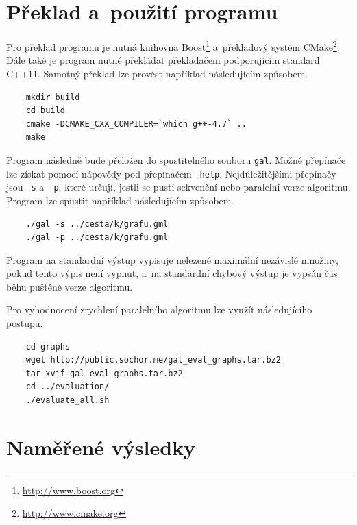 \documentclass[12pt]{article}
\begin{document}
\appendix
\section{Překlad a~použití programu} \label{appendix:ProgramUsage}
Pro překlad programu je nutná knihovna Boost\footnote{\url{http://www.boost.org}} a~překladový systém CMake\footnote{\url{http://www.cmake.org}}. Dále také je program nutné překládat překladačem podporujícím standard C++11. Samotný překlad lze provést například následujícím způsobem.
\begin{verbatim}
    mkdir build
    cd build
    cmake -DCMAKE_CXX_COMPILER=`which g++-4.7` ..
    make
\end{verbatim}

Program následně bude přeložen do spustitelného souboru \texttt{gal}. Možné přepínače lze získat pomocí nápovědy pod přepínačem \texttt{--help}. Nejdůležitějšími přepínačy jsou \texttt{-s} a~\texttt{-p}, které určují, jestli se pustí sekvenční nebo paralelní verze algoritmu. Program lze spustit například následujícím způsobem.
\begin{verbatim}
    ./gal -s ../cesta/k/grafu.gml
    ./gal -p ../cesta/k/grafu.gml
\end{verbatim}

Program na standardní výstup vypisuje nelezené maximální nezávislé množiny, pokud tento výpis není vypnut, a~na standardní chybový výstup je vypsán čas běhu puštěné verze algoritmu. 


Pro vyhodnocení zrychlení paralelního algoritmu lze využít následujícího postupu.
\begin{verbatim}
    cd graphs
    wget http://public.sochor.me/gal_eval_graphs.tar.bz2
    tar xvjf gal_eval_graphs.tar.bz2
    cd ../evaluation/
    ./evaluate_all.sh
\end{verbatim}



\section{Naměřené výsledky} \label{appendix:RawResults}
\end{document}
